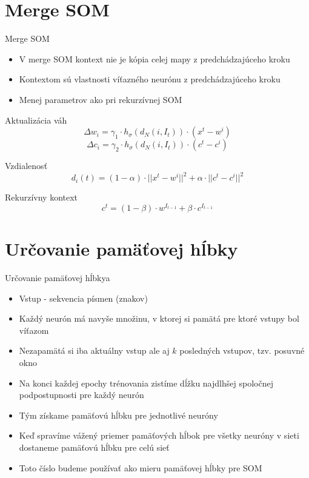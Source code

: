 \documentclass[10pt]{beamer}
\begin{document}
\section{Merge SOM}

\begin{frame}[fragile]{Merge SOM}

\begin{itemize}
\item V merge SOM kontext nie je kópia celej mapy z predchádzajúceho kroku
\item Kontextom sú vlastnosti víťazného neurónu z predchádzajúceho kroku
\item Menej parametrov ako pri rekurzívnej SOM
\end{itemize}
Aktualizácia váh
\begin{equation*}
\Delta w_i = \gamma_{1} \cdot h_{\sigma}(d_{N}(i, I_{t})) \cdot (x^t - w^i)
\end{equation*}
\begin{equation*}
\Delta c_i = \gamma_{2} \cdot h_{\sigma}(d_{N}(i, I_{t})) \cdot (c^t - c^i)
\end{equation*}

Vzdialenosť
\begin{equation*}
d_i(t) = (1-\alpha) \cdot ||x^t - w^i||^2 + \alpha \cdot ||c^t - c^i||^2
\end{equation*}

Rekurzívny kontext
\begin{equation*}
c^t = (1 - \beta) \cdot w^{I_{t-1}} + \beta \cdot c^{I_{t-1}}
\end{equation*}
\end{frame}

\section{Určovanie pamäťovej hĺbky}
\begin{frame}[fragile]{Určovanie pamäťovej hĺbky}a

\begin{itemize}
\item Vstup - sekvencia písmen (znakov)
\item Každý neurón má navyše množinu, v ktorej si pamätá pre ktoré vstupy bol víťazom
\item Nezapamätá si iba aktuálny vstup ale aj $k$ posledných vstupov, tzv. posuvné okno
\item Na konci každej epochy trénovania zistíme dĺžku najdlhšej spoločnej podpostupnosti pre každý neurón
\item Tým získame pamäťovú hĺbku pre jednotlivé neuróny
\item Keď spravíme vážený priemer pamäťových hĺbok pre všetky neuróny v sieti dostaneme pamäťovú hĺbku pre celú sieť
\item Toto číslo budeme používať ako mieru pamäťovej hĺbky pre SOM 
\end{itemize}

\end{frame}
\end{document}
